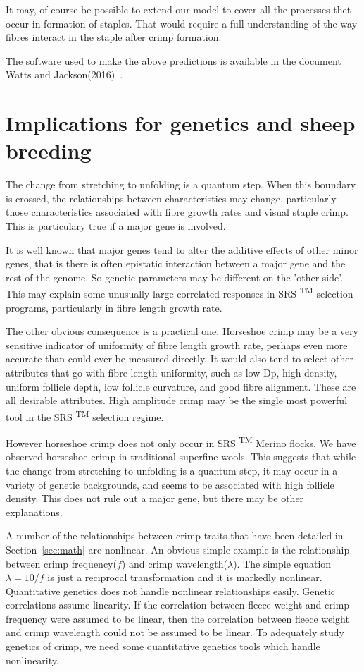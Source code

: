 \documentclass[titlepage,10pt]{article}  %
\begin{document}
It may, of course be possible to extend our model to cover all the processes thet occur in formation of staples.  That would require a full understanding of the way fibres interact in the staple after crimp formation.

The software used to make the above predictions is available in the document Watts and Jackson(2016)~\cite{watt:16}.


\clearpage
\section{Implications for genetics and sheep breeding}
The change from stretching to unfolding is a quantum step. When this boundary is crossed, the relationships between characteristics may change, particularly those characteristics associated with fibre growth rates and visual staple crimp. This is particulary true if a major gene is involved. 

It is well known that major genes tend to alter the additive effects of other minor genes, that is there is often epistatic interaction between a major gene and the rest of the genome. So genetic parameters may be different on the 'other side'. This may explain some unusually large correlated responses in SRS \textsuperscript{TM} selection programs, particularly in fibre length growth rate.

The other obvious consequence is a practical one. Horseshoe crimp may be a very sensitive indicator of uniformity of fibre length growth rate, perhaps even more accurate than could ever be measured directly. It would also tend to select other attributes that go with fibre length uniformity, such as low Dp, high density, uniform follicle depth, low follicle curvature, and good fibre alignment. These are all desirable attributes. High amplitude crimp may be the single most powerful tool in the SRS \textsuperscript{TM} selection regime.

However horseshoe crimp does not only occur in SRS \textsuperscript{TM} Merino flocks. We have observed horseshoe crimp in traditional superfine wools.  This suggests that while the change from stretching to unfolding is a quantum step, it may occur in a variety of genetic backgrounds, and seems to be associated with high follicle density. This does not rule out a major gene, but there may be other explanations.

A number of the relationships between crimp traits that have been detailed in Section~\ref{sec:math} are nonlinear. An obvious simple example is the relationship between crimp frequency($f$) and crimp wavelength($\lambda$). The simple equation $\lambda = 10/f$ is just a reciprocal transformation and it is markedly nonlinear. Quantitative genetics does not handle nonlinear relationships easily. Genetic correlations assume linearity. If the correlation between fleece weight and crimp frequency were assumed to be linear, then the correlation between fleece weight and crimp wavelength could not be assumed to be linear. To adequately study genetics of crimp, we need some quantitative genetics tools which handle nonlinearity.
\end{document}

